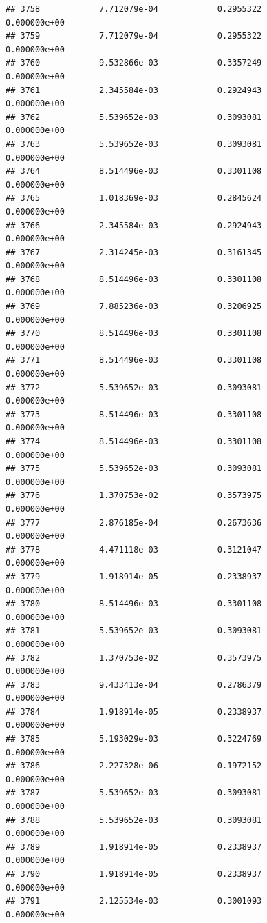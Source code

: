 \documentclass[
]{article}
\begin{document}
\begin{verbatim}
## 3758            7.712079e-04            0.2955322            0.000000e+00
## 3759            7.712079e-04            0.2955322            0.000000e+00
## 3760            9.532866e-03            0.3357249            0.000000e+00
## 3761            2.345584e-03            0.2924943            0.000000e+00
## 3762            5.539652e-03            0.3093081            0.000000e+00
## 3763            5.539652e-03            0.3093081            0.000000e+00
## 3764            8.514496e-03            0.3301108            0.000000e+00
## 3765            1.018369e-03            0.2845624            0.000000e+00
## 3766            2.345584e-03            0.2924943            0.000000e+00
## 3767            2.314245e-03            0.3161345            0.000000e+00
## 3768            8.514496e-03            0.3301108            0.000000e+00
## 3769            7.885236e-03            0.3206925            0.000000e+00
## 3770            8.514496e-03            0.3301108            0.000000e+00
## 3771            8.514496e-03            0.3301108            0.000000e+00
## 3772            5.539652e-03            0.3093081            0.000000e+00
## 3773            8.514496e-03            0.3301108            0.000000e+00
## 3774            8.514496e-03            0.3301108            0.000000e+00
## 3775            5.539652e-03            0.3093081            0.000000e+00
## 3776            1.370753e-02            0.3573975            0.000000e+00
## 3777            2.876185e-04            0.2673636            0.000000e+00
## 3778            4.471118e-03            0.3121047            0.000000e+00
## 3779            1.918914e-05            0.2338937            0.000000e+00
## 3780            8.514496e-03            0.3301108            0.000000e+00
## 3781            5.539652e-03            0.3093081            0.000000e+00
## 3782            1.370753e-02            0.3573975            0.000000e+00
## 3783            9.433413e-04            0.2786379            0.000000e+00
## 3784            1.918914e-05            0.2338937            0.000000e+00
## 3785            5.193029e-03            0.3224769            0.000000e+00
## 3786            2.227328e-06            0.1972152            0.000000e+00
## 3787            5.539652e-03            0.3093081            0.000000e+00
## 3788            5.539652e-03            0.3093081            0.000000e+00
## 3789            1.918914e-05            0.2338937            0.000000e+00
## 3790            1.918914e-05            0.2338937            0.000000e+00
## 3791            2.125534e-03            0.3001093            0.000000e+00

\end{verbatim}
\end{document}

